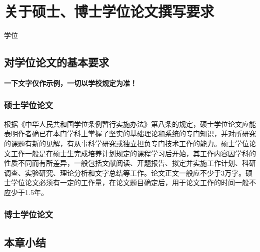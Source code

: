 ﻿
\chapter{关于硕士、博士学位论文撰写要求}
\label{chap:requires}

学位

\section{对学位论文的基本要求}

\textbf{一下文字仅作示例，一切以学校规定为准！}

\subsection{硕士学位论文}

根据《中华人民共和国学位条例暂行实施办法》第八条的规定，硕士学位论文应能表明作者确已在本门学科上掌握了坚实的基础理论和系统的专门知识，并对所研究的课题有新的见解，有从事科学研究或独立担负专门技术工作的能力。硕士学位论文工作一般是在硕士生完成培养计划规定的课程学习后开始，其工作内容因学科的性质不同而有所差异，一般包括文献阅读、开题报告、拟定并实施工作计划、科研调查、实验研究、理论分析和文字总结等工作。论文正文一般应不少于3万字。硕士学位论文必须有一定的工作量，在论文题目确定后，用于论文工作的时间一般不应少于1.5年。

\subsection{博士学位论文}





\section{本章小结}

